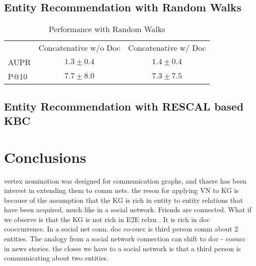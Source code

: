 \documentclass[paper=a4,fontsize=11pt]{scrartcl}
\numberwithin{equation}{section}    %
\numberwithin{figure}{section}      %
\numberwithin{table}{section}       %
\begin{document}
\subsection{Entity Recommendation with Random Walks}
\label{sec:er-rw}
\begin{table}[htbp]
  \centering
  \begin{tabular}{l c c}
         & Concatenative w/o Doc & Concatenative w/ Doc \\
    AUPR & $ 1.3 \pm 0.4 $       & $ 1.4 \pm 0.4 $      \\
    P@10 & $ 7.7 \pm 8.0 $       & $ 7.3 \pm 7.5 $      \\
  \end{tabular}
  \caption{Performance with Random Walks}
  \label{tab:perf-rw}
\end{table}



\subsection{Entity Recommendation with RESCAL based KBC}
\label{sec:er-rescal}


\section{Conclusions}
\label{sec:conclusions}

\begin{snugshade}
  {vertex nomination was designed for communication graphs, and thaere has
been interest in extending them to comm nets. the reson for applying VN to KG is
because of the assumption that the KG is rich in entity to entity relations that
have been acquired, much like in a social network. Friends are connected. What
if we observe is that the KG is not rich in E2E relxn . It is rich in doc
cooccurrence. In a social net conn. doc co-oucc is third person comm about 2
entities. The analogy from a social network connection can shift to doc - cooucc
in news stories. the closes we have to a social network is that a third person
is communicating about two entities.}
\end{snugshade}


\end{document}
